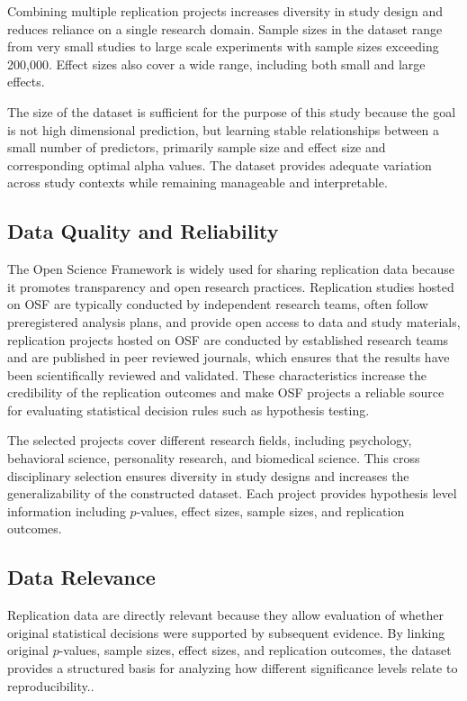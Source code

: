 {Combining multiple replication projects increases diversity in study design and reduces reliance on a single research domain. Sample sizes in the dataset range from very small studies to large scale experiments with sample sizes exceeding 200,000. Effect sizes also cover a wide range, including both small and large effects.

The size of the dataset is sufficient for the purpose of this study because the goal is not high dimensional prediction, but learning stable relationships between a small number of predictors, primarily sample size and effect size and corresponding optimal alpha values. The dataset provides adequate variation across study contexts while remaining manageable and interpretable.

\subsection{Data Quality and Reliability}

The Open Science Framework is widely used for sharing replication data because it promotes transparency and open research practices. Replication studies hosted on OSF are typically conducted by independent research teams, often follow preregistered analysis plans, and provide open access to data and study materials, replication projects hosted on OSF are conducted by established research teams and are published in peer reviewed journals, which ensures that the results have been scientifically reviewed and validated\cite{FosterDeardorff2017}. These characteristics increase the credibility of the replication outcomes and make OSF projects a reliable source for evaluating statistical decision rules such as hypothesis testing.

The selected projects cover different research fields, including psychology, behavioral science, personality research, and biomedical science. This cross disciplinary selection ensures diversity in study designs and increases the generalizability of the constructed dataset. Each project provides hypothesis level information including $p$-values, effect sizes, sample sizes, and replication outcomes.

\subsection{Data Relevance}

Replication data are directly relevant because they allow evaluation of whether original statistical decisions were supported by subsequent evidence\cite{FosterDeardorff2017}. By linking original $p$-values, sample sizes, effect sizes, and replication outcomes, the dataset provides a structured basis for analyzing how different significance levels relate to reproducibility..

}
